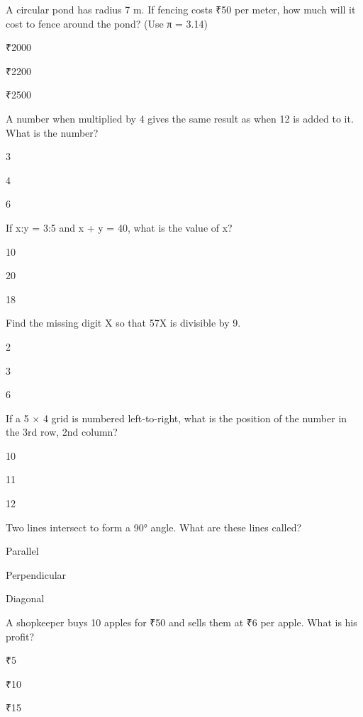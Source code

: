 \begin{enhancedmcq}{A circular pond has radius 7 m. If fencing costs ₹50 per meter, how much will it cost to fence around the pond? (Use π = 3.14)}
\item ₹2000
\item ₹2200
\item ₹2500

\end{enhancedmcq}
\begin{enhancedmcq}{A number when multiplied by 4 gives the same result as when 12 is added to it. What is the number?}
\item 3
\item 4
\item 6

\end{enhancedmcq}
\begin{enhancedmcq}{If x:y = 3:5 and x + y = 40, what is the value of x?}
\item 10
\item 20
\item 18

\end{enhancedmcq}
\begin{enhancedmcq}{Find the missing digit X so that 57X is divisible by 9.}
\item 2
\item 3
\item 6

\end{enhancedmcq}
\begin{enhancedmcq}{If a 5 × 4 grid is numbered left-to-right, what is the position of the number in the 3rd row, 2nd column?}
\item 10
\item 11
\item 12

\end{enhancedmcq}
\begin{enhancedmcq}{Two lines intersect to form a 90° angle. What are these lines called?}
\item Parallel
\item Perpendicular
\item Diagonal

\end{enhancedmcq}
\begin{enhancedmcq}{A shopkeeper buys 10 apples for ₹50 and sells them at ₹6 per apple. What is his profit?}
\item ₹5
\item ₹10
\item ₹15

\end{enhancedmcq}
